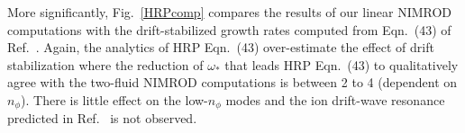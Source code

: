 More significantly, Fig.~\ref{HRPcomp} compares the results of our linear
NIMROD computations with the drift-stabilized growth rates computed from
Eqn.~(43) of Ref.~\cite{Hastie03}. Again, the analytics of HRP Eqn.~(43)
over-estimate the effect of drift stabilization where the reduction of
$\omega_*$ that leads HRP Eqn.~(43) to qualitatively agree with the two-fluid
NIMROD computations is between 2 to 4 (dependent on $n_\phi$). There is little
effect on the low-$n_\phi$ modes and the ion drift-wave resonance predicted in
Ref.~\cite{Hastie03} is not observed.


%
%
